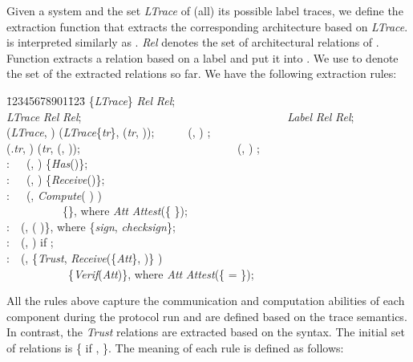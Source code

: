 \documentclass{llncs}
\begin{document}
Given a system  and the set \textit{LTrace} of (all) its possible label traces, we define the 
extraction function  that extracts the corresponding architecture based on 
\textit{LTrace}.  is interpreted similarly as . 
\textit{Rel} denotes the set of architectural relations of . Function  extracts 
a relation based on a label  and put it into . We use  to denote the set 
of the extracted relations so far. We have the following 
extraction rules:  
\small
\begin{tabbing}
    \=12345678901\=123\= \kill
    \>   \{\textit{LTrace}\}  \textit{Rel}  \textit{Rel};\\
    \>   \textit{LTrace}  \textit{Rel}  \textit{Rel}; \ \ \ \ \ \ \ \ \ \ \ \ \ \ \ \ \ \ \ \ \ \ \ \ \ \ \ \ \ \ \ \ \ \ \ \   \textit{Label}  \textit{Rel}  \textit{Rel};\\ 
    \> (\textit{LTrace}, )   (\textit{LTrace}\{\textit{tr}\}, (\textit{tr}, ));\ \ \ \ \ \  
    (, )   ;\\  
    \> (.\textit{tr}, )   (\textit{tr}, (, ));\ \ \ \ \ \ \ \ \ \ \ \ \ \ \ \ \ \ \ \ \ \ \ \ \ \ \ \  (, )  ;\\
    \>:\ \ \ (, )    \{\textit{Has}()\};\\
    \>:\ \ \ (, )    \{\textit{Receive}()\};\\
    \>:\ \ \ (, \textit{Compute}(  )  ) \\
    \>\ \ \ \ \ \ \ \ \ \   \{\}, where \textit{Att}  \textit{Attest}(\{  \});\\ 
    \>:\ \ (,     (  )\}, where   \{\textit{sign}, \textit{checksign}\};\\  
    \> :\ \ (, )      
     if     ;\\
    \> :\ \ (, \{\textit{Trust}, \textit{Receive}(\{\textit{Att}\}, )\}  ) \\ 
    \>\ \ \ \ \ \ \ \ \ \ \   \{\textit{Verif}(\textit{Att})\}, where \textit{Att}  \textit{Attest}(\{ = \});
\end{tabbing}
\normalsize

All the rules above capture the communication and computation abilities of each component during the protocol run and 
are defined based on the trace semantics. In contrast, the \textit{Trust} relations are extracted 
based on the syntax. The initial set of relations is   \{ if        ,   \}. The meaning of each rule is defined as follows:
\end{document}
